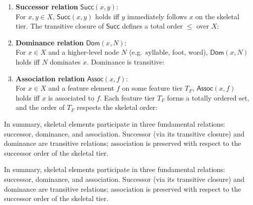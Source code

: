 \documentclass[11pt]{article}
\begin{document}
\begin{enumerate}
    \item \textbf{Successor relation} $\mathsf{Succ}(x,y)$: \\
    For $x,y \in X$, $\mathsf{Succ}(x,y)$ holds iff $y$ immediately follows $x$ on the skeletal tier. 
    The transitive closure of $\mathsf{Succ}$ defines a total order $\leq$ over $X$:

    \item \textbf{Dominance relation} $\mathsf{Dom}(x,N)$: \\
    For $x \in X$ and a higher-level node $N$ (e.g.\ syllable, foot, word), 
    $\mathsf{Dom}(x,N)$ holds iff $N$ dominates $x$. 
    Dominance is transitive:

    \item \textbf{Association relation} $\mathsf{Assoc}(x,f)$: \\
    For $x \in X$ and a feature element $f$ on some feature tier $T_F$, 
    $\mathsf{Assoc}(x,f)$ holds iff $x$ is associated to $f$. 
    Each feature tier $T_F$ forms a totally ordered set, and the order of $T_F$ 
    respects the skeletal order:
\end{enumerate}

In summary, skeletal elements participate in three fundamental relations: 
successor, dominance, and association. 
Successor (via its transitive closure) and dominance are transitive relations; 
association is preserved with respect to the successor order of the skeletal tier.

In summary, skeletal elements participate in three fundamental relations: successor, dominance, and association. 
Successor (via its transitive closure) and dominance are transitive relations; association is preserved with respect to the successor order of the skeletal tier.
\end{document}
